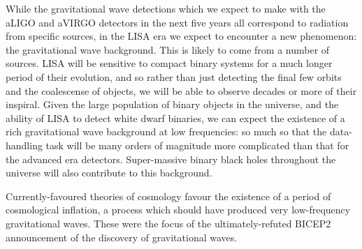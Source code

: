 
While the gravitational wave detections which we expect to make with
the aLIGO and aVIRGO detectors in the next five years all correspond
to radiation from specific sources, in the LISA era we expect to
encounter a new phenomenon: the gravitational wave
background\cite{2009LRR....12....2S}. This is likely to come from a
number of sources. LISA will be sensitive to compact binary systems
for a much longer period of their evolution, and so rather than just
detecting the final few orbits and the coalescense of objects, we will
be able to observe decades or more of their inspiral. Given the large
population of binary objects in the universe, and the ability of LISA
to detect white dwarf binaries, we can expect the existence of a rich
gravitational wave background at low frequencies: so much so that the
data-handling task will be many orders of magnitude more complicated
than that for the advanced era detectors.  Super-massive binary black
holes throughout the universe will also contribute to this background.

Currently-favoured theories of cosmology favour the existence of a
period of cosmological inflation, a process which should have produced
very low-frequency gravitational waves.  These were the focus of the
ultimately-refuted BICEP2 announcement\cite{2014PhRvL.112x1101B} of
the discovery of gravitational waves.

